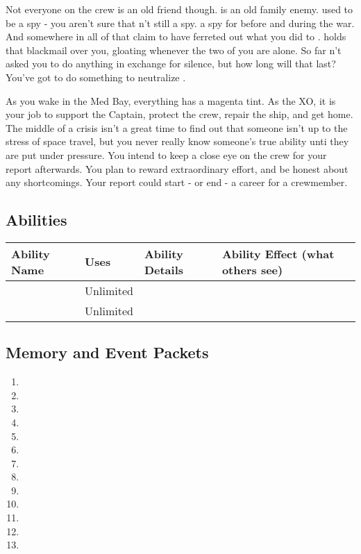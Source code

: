 \documentclass[char]{TMFHope}
\begin{document}
Not everyone on the crew is an old friend though. \cDip{} is an old family enemy. \cDip{\They} used to be a spy - you aren't sure that \cDip{\they} \cDip{\are}n't still a spy. \cDip{\They} \cDip{\were} a spy for \pPlan{} before and during the war. And somewhere in all of that \cDip{\they} claim\cDip{\plural} to have ferreted out what you did to \cCap{}. \cDip{} holds that blackmail over you, gloating whenever the two of you are alone. So far \cDip{\they} \cDip{\have}n't asked you to do anything in exchange for \cDip{\their} silence, but how long will that last? You've got to do something to neutralize \cDip{\them}.

As you wake in the Med Bay, everything has a magenta tint.  As the XO, it is your job to support the Captain, protect the crew, repair the ship, and get home. The middle of a crisis isn't a great time to find out that someone isn't up to the stress of space travel, but you never really know someone's true ability unti they are put under pressure. You intend to keep a close eye on the crew for your report afterwards. You plan to reward extraordinary effort, and be honest about any shortcomings. Your report could start - or end - a career for a crewmember.

\subsection*{Abilities}
\begin{tabular}{|p{3cm}|p{1.5cm}|p{8cm}|p{3.5cm}|} 
 \hline
 \textbf{Ability Name} & \textbf{Uses} & \textbf{Ability Details} & \textbf{Ability Effect (what others see)} \\ 
\hline 
\aThreat{\MYname} & Unlimited & \aThreat{\MYtext} & \aThreat{\MYeffect} \\ 
\hline 
\aCalculate{\MYname} & Unlimited & \aCalculate{\MYtext} & \aCalculate{\MYeffect}\\ 
 \hline
\end{tabular}

\subsection*{Memory and Event Packets}
\begin{enumerate}
	\item \mPractice{\MYname}
	\item \mXAlpha{\MYname}
	\item \mThreatOne{\MYname}
	\item \mThreatTwo{\MYname}
	\item \mThreatThree{\MYname}
	\item \mThreatFour{\MYname}
	\item \mBroom{\MYname}
	\item \mLab{\MYname}
	\item \mPatient{\MYname}
	\item \mKitchen{\MYname}
	\item \mWeight{\MYname}
	\item \mTheater{\MYname}
	\item \mCrates{\MYname}
\end{enumerate}
\end{document}

